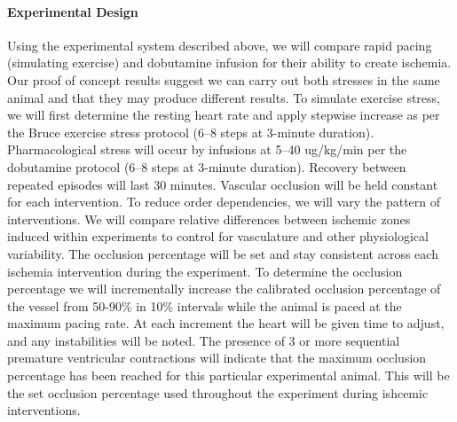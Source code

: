 \paragraph{Experimental Design} Using the experimental system described above, we will compare rapid pacing (simulating exercise) and dobutamine infusion for their ability to create ischemia. Our proof of concept results suggest we can carry out both stresses in the same animal and that they may produce different results.  To simulate exercise stress, we will first determine the resting heart rate and apply stepwise increase as per the Bruce exercise stress protocol (6--8 steps at 3-minute duration).\cite{BLZ:Oki1986} Pharmacological stress will occur by infusions at 5--40 ug/kg/min per the dobutamine protocol (6--8 steps at 3-minute duration).\cite{BLZ:SAL1992} Recovery between repeated episodes will last 30 minutes. Vascular occlusion will be held constant for each intervention. To reduce order dependencies, we will vary the pattern of interventions. We will compare relative differences between ischemic zones induced within experiments to control for vasculature and other physiological variability. The occlusion percentage will be set and stay consistent across each ischemia intervention during the experiment. To determine the occlusion percentage we will incrementally increase the calibrated occlusion percentage of the vessel from 50-90\% in 10\% intervals while the animal is paced at the maximum pacing rate. At each increment the heart will be given time to adjust, and any instabilities will be noted. The presence of 3 or more sequential premature ventricular contractions will indicate that the maximum occlusion percentage has been reached for this particular experimental animal. This will be the set occlusion percentage used throughout the experiment during ishcemic interventions. 

